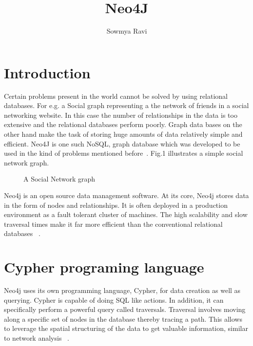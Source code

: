 \documentclass[9pt,twocolumn,twoside]{styles/osajnl}
\title{Neo4J}
\author[1]{Sowmya Ravi}
\affil[1]{School of Informatics and Computing, Bloomington, IN 47408, U.S.A.}
\affil[*]{Corresponding authors: sowravi@iu.edu.com}
\begin{document}
\maketitle

\section{Introduction}
Certain problems present in the world cannot be solved by using relational databases. For e.g. a Social graph representing a the network of friends in a social networking website. In this case the number of relationships in the data is too extensive and the relational databases perform poorly. Graph data bases on the other hand make the task of storing huge amounts of data relatively simple and efficient. Neo4J is one such NoSQL, graph database which was developed to be used in the kind of problems mentioned before~\cite{www-neo4j-intro2}. Fig.1 illustrates a simple social network graph.
\begin{figure}[htbp]
\centering
{}
\caption{A Social Network graph ~\cite{www-graph-img}}
\label{fig:false-color}
\end{figure}


Neo4j is an open source data management software. At its core, Neo4j stores data in the form of nodes and relationships. It is often deployed in a production environment as a fault tolerant cluster of machines. The high scalability and slow traversal times make it far more efficient than the conventional relational databases ~\cite{www-neo4j-intro}. 

\section{Cypher programing language}
Neo4j uses its own programming language, 
Cypher, for data creation as well as querying. Cypher is capable of doing SQL like actions. In addition, it can specifically perform a powerful query called traversals. Traversal involves moving along a specific set of nodes in the database thereby tracing a path. This allows to leverage the spatial structuring of the data to get valuable information, similar to network 
analysis ~\cite{www-slideshare}. 
\end{document}
